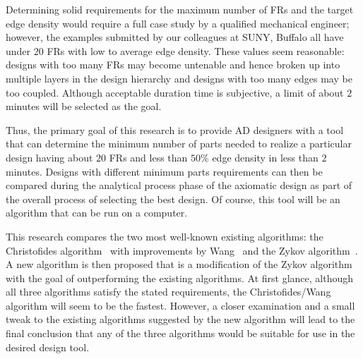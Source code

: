 Determining solid requirements for the maximum number of FRs and the target edge density would require a full case
study by a qualified mechanical engineer; however, the examples submitted by our colleagues at SUNY, Buffalo all
have under \(20\) FRs with low to average edge density.  These values seem reasonable: designs with too many FRs
may become untenable and hence broken up into multiple layers in the design hierarchy and designs with too many
edges may be too coupled.  Although acceptable duration time is subjective, a limit of about \(2\) minutes will be
selected as the goal.

Thus, the primary goal of this research is to provide AD designers with a tool that can determine the minimum
number of parts needed to realize a particular design having about \(20\) FRs and less than \(50\%\) edge density
in less than \(2\) minutes.  Designs with different minimum parts requirements can then be compared during the
analytical process phase of the axiomatic design as part of the overall process of selecting the best design.  Of
course, this tool will be an algorithm that can be run on a computer.

This research compares the two most well-known existing algorithms: the Christofides algorithm~\cite{christofides}
with improvements by Wang~\cite{wang} and the Zykov algorithm~\cite{corneil}.  A new algorithm is then proposed that
is a modification of the Zykov algorithm with the goal of outperforming the existing algorithms.  At first glance,
although all three algorithms satisfy the stated requirements, the Christofides/Wang algorithm will seem to be the
fastest.  However, a closer examination and a small tweak to the existing algorithms suggested by the new algorithm
will lead to the final conclusion that any of the three algorithms would be suitable for use in the desired
design tool.
